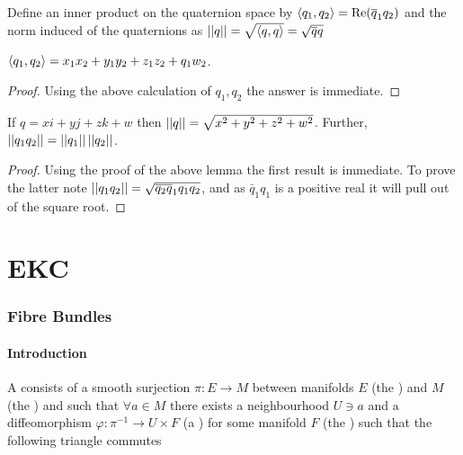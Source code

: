 \documentclass{article}
\begin{document}
\begin{definition}
	Define an inner product on the quaternion space by $\left\langle q_1,q_2 \right\rangle = \operatorname{Re}(\overline{q}_1 q_2)$ and the norm induced of the quaternions as $\left\lvert\left\lvert q \right\rvert\right\rvert = \sqrt{\left\langle q,q \right\rangle}=\sqrt{\overline{q}q}$ 
\end{definition}

\begin{lemma}
	$\left\langle q_1,q_2 \right\rangle = x_1x_2 + y_1y_2 + z_1z_2 + q_1w_2$. 
\end{lemma}
\begin{proof}
	Using the above calculation of $q_1,q_2$ the answer is immediate. 
\end{proof}

\begin{lemma}
If $q = xi + yj + zk + w$ then $\left\lvert\left\lvert q \right\rvert\right\rvert = \sqrt{x^2 + y^2 + z^2 + w^2}$. Further, $\left\lvert\left\lvert q_1 q_2 \right\rvert\right\rvert = \left\lvert\left\lvert q_1 \right\rvert\right\rvert\left\lvert\left\lvert q_2 \right\rvert\right\rvert$. 
\end{lemma}
\begin{proof}
	Using the proof of the above lemma the first result is immediate. To prove the latter note $\left\lvert\left\lvert q_1 q_2 \right\rvert\right\rvert = \sqrt{\overline{q_2} \overline{q}_1 q_1 q_2}$, and as $\bar{q}_1 q_1$ is a positive real it will pull out of the square root. 
\end{proof}

\part{EKC}
\section{Fibre Bundles}
\subsection{Introduction}
\begin{definition}
	A  consists of a smooth surjection $\pi : E \to M$ between manifolds $E$ (the ) and $M$ (the ) and such that $\forall a \in M$ there exists a neighbourhood $U \ni a$ and a diffeomorphism $\varphi : \pi^{-1} \to U \times F$ (a ) for some manifold $F$ (the ) such that the following triangle commutes 
	\begin{center}
	\end{center}
\end{definition}
\end{document}
